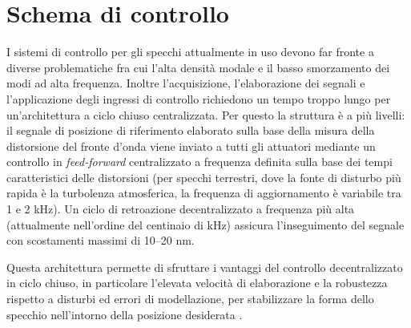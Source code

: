 \section{Schema di controllo}
I sistemi di controllo per gli specchi attualmente in uso devono far fronte a diverse problematiche fra cui l'alta densità modale e il basso smorzamento dei modi ad alta frequenza. Inoltre l'acquisizione, l'elaborazione dei segnali e l'applicazione degli ingressi di controllo richiedono un tempo troppo lungo per un'architettura a ciclo chiuso centralizzata. Per questo la struttura è a più livelli: il segnale di posizione di riferimento elaborato sulla base della misura della distorsione del fronte d'onda viene inviato a tutti gli attuatori mediante un controllo in \textit{feed-forward} centralizzato a frequenza definita sulla base dei tempi caratteristici delle distorsioni (per specchi terrestri, dove la fonte di disturbo più rapida è la turbolenza atmosferica, la frequenza di aggiornamento è variabile tra 1 e 2 kHz). Un ciclo di retroazione decentralizzato a frequenza più alta (attualmente nell'ordine del centinaio di kHz) assicura l'inseguimento del segnale con scostamenti
massimi di 10--20 nm.


Questa architettura permette di sfruttare i vantaggi del controllo
decentralizzato in ciclo chiuso, in particolare l'elevata velocità di elaborazione e la
robustezza rispetto a disturbi ed errori di modellazione, per stabilizzare la forma dello specchio nell'intorno della posizione desiderata \citep{manetti_high_2010}.

